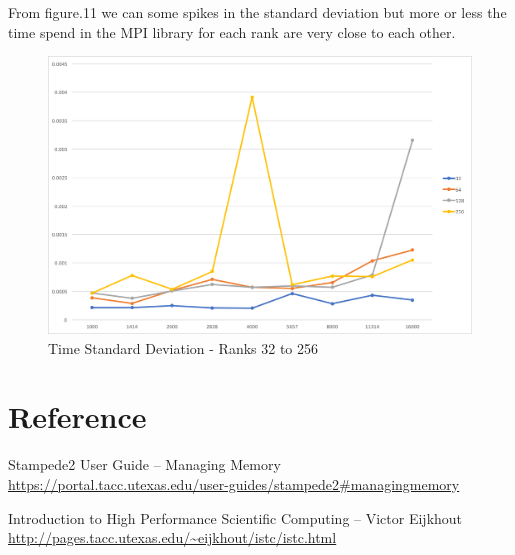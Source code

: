 \documentclass[12pt]{article} %
\begin{document}
\newpage

From figure.11 we can some spikes in the standard deviation but more or less the time spend in the MPI library for each rank are very close to each other. 

\begin{figure}[htb]
\caption{Time Standard Deviation - Ranks 32 to 256}\label{fig:benchmark05}
\centering
\includegraphics[width=\textwidth,keepaspectratio]{imgs/img011.png}
\end{figure}

\newpage



\section{Reference}

\begin{flushleft}
Stampede2 User Guide -- Managing Memory \\ \url{https://portal.tacc.utexas.edu/user-guides/stampede2#managingmemory}

Introduction to High Performance Scientific Computing -- Victor Eijkhout \\ \url{http://pages.tacc.utexas.edu/~eijkhout/istc/istc.html}
\end{flushleft}
\end{document}
